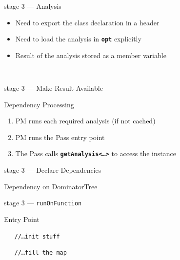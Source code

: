\documentclass[14pt]{beamer}
\newcommand{\Command}[1]{\textbf{\texttt{#1}}}
\newcommand{\Code}[1]{\textbf{\texttt{#1}}}
\begin{document}
    \begin{frame}[containsverbatim]{stage 3 --- Analysis}

        \begin{itemize}
            \item Need to export the class declaration in a header
            \item Need to load the analysis in \Command{opt} explicitly
            \item Result of the analysis stored as a member variable
        \end{itemize}

        \\
        {
        \footnotesize
        
        }
    \end{frame}

    \begin{frame}[containsverbatim]{stage 3 --- Make Result Available}
        \begin{alertblock}{Dependency Processing}
            \begin{enumerate}
                \item PM runs each required analysis (if not cached)
                \item PM runs the Pass entry point
                \item The Pass calls \Code{getAnalysis<\dots>} to access the instance
            \end{enumerate}
        \end{alertblock}
    \end{frame}


    \begin{frame}[containsverbatim]{stage 3 --- Declare Dependencies}

        \begin{alertblock}{Dependency on DominatorTree}
        {
        \footnotesize
        
        }
        \end{alertblock}

    \end{frame}

    \begin{frame}[containsverbatim]{stage 3 --- \texttt{runOnFunction}}
        \begin{alertblock}{Entry Point}
        {
        \footnotesize
        
        \texttt{~~~//\dots init stuff}
        
        \texttt{~~~//\dots fill the map}
        
        }
        \end{alertblock}
    \end{frame}
\end{document}
